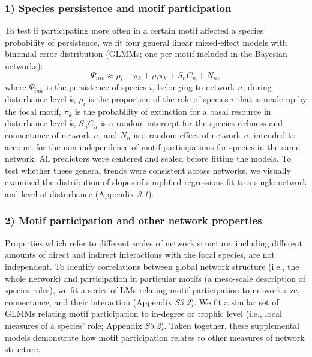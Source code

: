 \documentclass[12pt]{article}
\begin{document}
\begin{spacing}{2.0}
        
        \subsubsection*{1) Species persistence and motif participation}

            To test if participating more often in a certain motif affected a species' probability of persistence, we fit four general linear mixed-effect models with binomial error distribution (GLMMs; one per motif included in the Bayesian networks):
                \begin{equation}
                    \Psi_{ink} \approx \rho_{i} + \pi_{k} + \rho_{i}\pi_{k} +
                    S_{n}C_{n} + N_n,
                    \label{propreq}
                \end{equation}
            \noindent where $\Psi_{ink}$ is the persistence of species $i$, belonging to network $n$, during disturbance level $k$, $\rho_{i}$ is the proportion of the role of species $i$ that is made up by the focal motif, $\pi_k$ is the probability of extinction for a basal resource in disturbance level $k$,  $S_{n}C_{n}$ is a random intercept for the species richness and connectance of network $n$, and $N_n$ is a random effect of network $n$, intended to account for the non-independence of motif participations for species in the same network.
            All predictors were centered and scaled before fitting the models.         
            To test whether these general trends were consistent across networks, we visually examined the distribution of slopes of simplified regressions fit to a single network and level of disturbance (Appendix \emph{3.1}).
        
        \subsubsection*{2) Motif participation and other network properties}    
            
            Properties which refer to different scales of network structure, including different amounts of direct and indirect interactions with the focal species, are not independent. 
            To identify correlations between global network structure (i.e., the whole network) and participation in particular motifs (a meso-scale description of species roles), we fit a series of LMs relating motif participation to network size, connectance, and their interaction (Appendix \emph{S3.2}).
            We fit a similar set of  GLMMs relating motif participation to in-degree or trophic level (i.e., local measures of a species' role; Appendix \emph{S3.2}).
            Taken together, these supplemental models demonstrate how motif participation relates to other measures of network structure.
            

\end{spacing}
\end{document}
